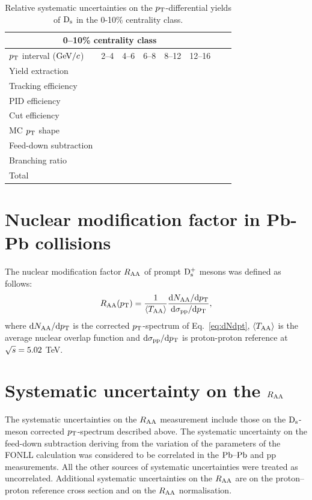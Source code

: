 \begin{table}[!h]
\centering
\begin{tabular}{|l|l|l|c|c|c|c|c|}
\hline
\multicolumn{6}{|c|}{0--10\% centrality class}       \\                                                                                                                                                                                                                                               \hline
$p_{\rm T}$ interval ($\mathrm{GeV}/c$)           & 2--4        &    4--6          & 6--8      &   8--12            & 12--16                  \\ 
Yield extraction & & & & & \\
Tracking efficiency & & & & & \\
PID efficiency & & & & & \\
Cut efficiency & & & & & \\
MC $p_{\rm T}$ shape & & & & & \\
Feed-down subtraction & & & & & \\
Branching ratio & & & & & \\
Total & & & & & \\
\hline
\end{tabular}
\caption{Relative systematic uncertainties on the $p_{\rm T}$-differential yields of ${\rm D_s}$ in the 0-10\% centrality class.}
\label{tab:sysunc_yieldtable}
\end{table}

\section{Nuclear modification factor in Pb-Pb collisions}
\label{sec:RAA}
The nuclear modification factor $R_{\rm AA}$ of prompt ${\rm D_s^+}$ mesons was defined as follows:
\begin{equation}
\label{eq:RAADs}
R_{\rm AA} (p_{\rm T}) = \frac{1}{\langle T_{\rm AA} \rangle} \frac{{\rm d} N_{\rm AA}/{\rm d}p_{\rm T}}{{\rm d} \sigma_{\rm pp}/{\rm d} p_{\rm T}},
\end{equation}
where ${\rm d} N_{\rm AA}/{\rm d}p_{\rm T}$ is the corrected $p_{\rm T}$-spectrum of 
Eq.~\ref{eq:dNdpt}, $\langle T_{\rm AA} \rangle$ is the 
average nuclear overlap function and ${\rm d} \sigma_{\rm pp}/{\rm d} p_{\rm T}$ is 
proton-proton reference at $\sqrt{s} = 5.02$ TeV.
\section{Systematic uncertainty on the $R_{\rm AA}$}
\label{sec:SystRAA}
The systematic uncertainties on the $R_{\rm AA}$ measurement include those 
on the ${\rm D_s}$-meson corrected $p_{\rm T}$-spectrum described above. The systematic 
uncertainty on the feed-down subtraction deriving from
the variation of the parameters of the FONLL calculation was considered to be
correlated in the $\mbox{Pb--Pb}$ and pp measurements. All the 
other sources of systematic uncertainties were treated as uncorrelated. 
Additional systematic uncertainties on the $R_{\rm AA}$ are on 
the proton--proton reference cross section and on the $R_{\rm AA}$ normalisation. 

